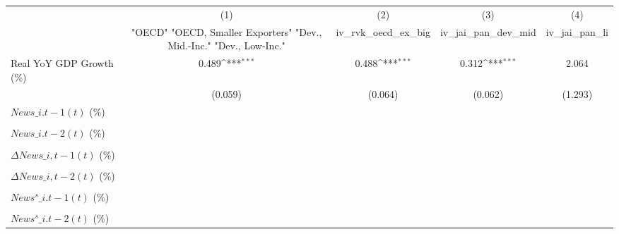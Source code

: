 {
\def\sym#1{\ifmmode^{#1}\else\(^{#1}\)\fi}
\begin{tabular}{l*{4}{c}}
\toprule
                    &\multicolumn{1}{c}{(1)}&\multicolumn{1}{c}{(2)}&\multicolumn{1}{c}{(3)}&\multicolumn{1}{c}{(4)}\\
                    &\multicolumn{1}{c}{ "OECD" "OECD, Smaller Exporters" "Dev., Mid.-Inc." "Dev., Low-Inc."}&\multicolumn{1}{c}{iv\_rvk\_oecd\_ex\_big}&\multicolumn{1}{c}{iv\_jai\_pan\_dev\_mid}&\multicolumn{1}{c}{iv\_jai\_pan\_li}\\
\midrule
Real YoY GDP Growth (\%)&       0.489\sym{***}&       0.488\sym{***}&       0.312\sym{***}&       2.064         \\
                    &     (0.059)         &     (0.064)         &     (0.062)         &     (1.293)         \\
\addlinespace
$ News\_{i.t-1}(t)$ (\%)&                     &                     &                     &                     \\
                    &                     &                     &                     &                     \\
\addlinespace
$ News\_{i.t-2}(t)$ (\%)&                     &                     &                     &                     \\
                    &                     &                     &                     &                     \\
\addlinespace
$ \Delta News\_{i,t-1}(t)$ (\%)&                     &                     &                     &                     \\
                    &                     &                     &                     &                     \\
\addlinespace
$ \Delta News\_{i,t-2}(t)$ (\%)&                     &                     &                     &                     \\
                    &                     &                     &                     &                     \\
\addlinespace
$ News^s\_{i.t-1}(t)$ (\%)&                     &                     &                     &                     \\
                    &                     &                     &                     &                     \\
\addlinespace
$ News^s\_{i.t-2}(t)$ (\%)&                     &                     &                     &                     \\

\end{tabular}}
